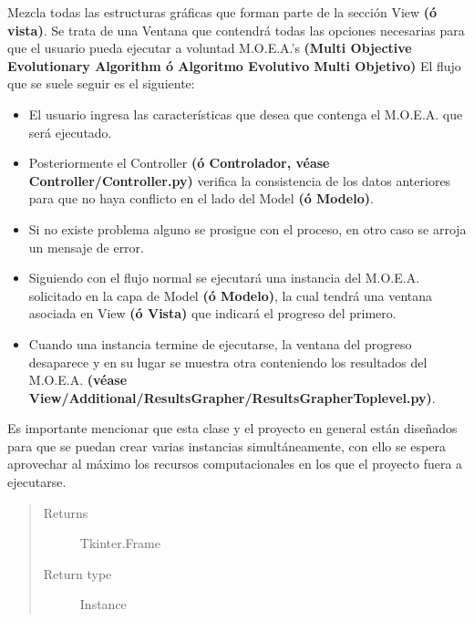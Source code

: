 \documentclass[class=report, crop=false]{standalone}
\begin{document}
\begin{fulllineitems}

\begin{DUlineblock}{0em}
\item[] Mezcla todas las estructuras gráficas que forman parte de la 
sección View \textbf{(ó vista)}.\break
Se trata de una Ventana que contendrá todas las opciones necesarias 
para que el usuario pueda ejecutar a voluntad M.O.E.A.'s \textbf{(Multi Objective Evolutionary Algorithm
ó Algoritmo Evolutivo Multi Objetivo)}\medskip\break
El flujo que se suele seguir es el siguiente:

\begin{itemize}
\item El usuario ingresa las características que desea que contenga el M.O.E.A. que será ejecutado.
\item Posteriormente el Controller \textbf{(ó Controlador, véase Controller/Controller.py)} verifica la consistencia de los datos anteriores para que no haya conflicto en el lado del Model \textbf{(ó Modelo)}.
\item Si no existe problema alguno se prosigue con el proceso, en otro caso se arroja un mensaje de error.
\item Siguiendo con el flujo normal se ejecutará una instancia del M.O.E.A. solicitado en la capa de Model \textbf{(ó Modelo)}, la cual tendrá una ventana asociada en View \textbf{(ó Vista)} que indicará el progreso del primero.
\item Cuando una instancia termine de ejecutarse, la ventana del progreso desaparece y en su lugar se muestra otra conteniendo los resultados del M.O.E.A. \textbf{(véase View/Additional/ResultsGrapher/ResultsGrapherToplevel.py)}.
\end{itemize}

Es importante mencionar que esta clase y el proyecto en general están 
diseñados para que se puedan crear varias instancias simultáneamente, 
con ello se espera aprovechar al máximo los recursos computacionales 
en los que el proyecto fuera a ejecutarse.
\end{DUlineblock}

\begin{quote}\begin{description}
\item[{Returns}] \leavevmode
Tkinter.Frame
\item[{Return type}] \leavevmode
Instance
\end{description}\end{quote}


\end{fulllineitems}
\end{document}
